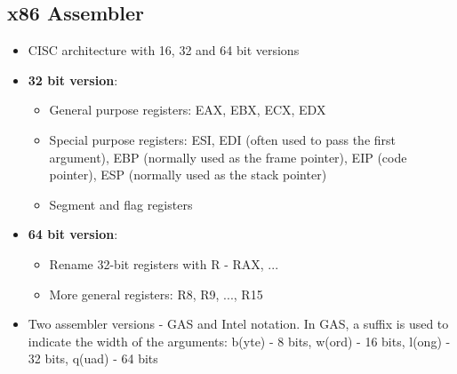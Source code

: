 \documentclass{article}
\begin{document}
\subsection{x86 Assembler}
\begin{itemize}
	\item CISC architecture with 16, 32 and 64 bit versions
	\item \textbf{32 bit version}:
	\begin{itemize}
		\item General purpose registers: EAX, EBX, ECX, EDX
		\item Special purpose registers: ESI, EDI (often used to pass the first argument), EBP (normally used as the frame pointer), EIP (code pointer), ESP (normally used as the stack pointer)
		\item Segment and flag registers
	\end{itemize}

	\item \textbf{64 bit version}:
	\begin{itemize}
		\item Rename 32-bit registers with R - RAX, ...
		\item More general registers: R8, R9, ..., R15
	\end{itemize}

	\item Two assembler versions - GAS and Intel notation. In GAS, a suffix is used to indicate the width of the arguments: b(yte) - 8 bits, w(ord) - 16 bits, l(ong) - 32 bits, q(uad) - 64 bits
	

\end{itemize}

\noindent
\end{document}
